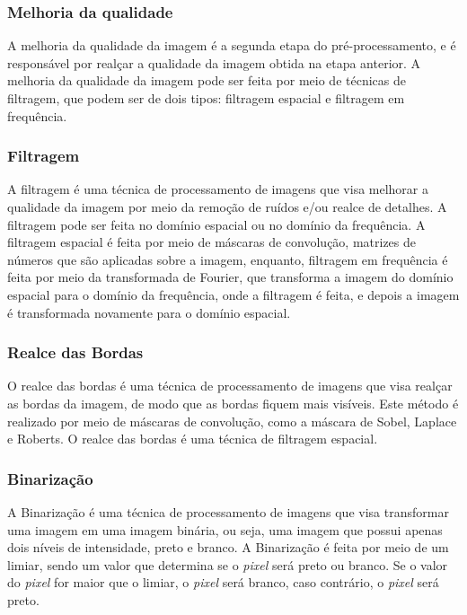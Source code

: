 \documentclass[conference]{IEEEtran}
\begin{document}
\subsubsection{Melhoria da qualidade}
A melhoria da qualidade da imagem é a segunda etapa do pré-processamento, e é responsável por realçar a qualidade 
da imagem obtida na etapa anterior. A melhoria da qualidade da imagem pode ser feita por meio de técnicas de 
filtragem, que podem ser de dois tipos: filtragem espacial e filtragem em frequência.

\subsubsection{Filtragem}

A filtragem é uma técnica de processamento de imagens que visa melhorar a qualidade da imagem por meio da 
remoção de ruídos e/ou realce de detalhes. A filtragem pode ser feita no domínio espacial ou no domínio da 
frequência. A filtragem espacial é feita por meio de máscaras de convolução, matrizes de números que são aplicadas 
sobre a imagem, enquanto, filtragem em frequência é feita por meio da transformada de Fourier, que transforma a 
imagem do domínio espacial para o domínio da frequência, onde a filtragem é feita, e depois a imagem é transformada novamente para o domínio espacial.

\subsubsection{Realce das Bordas}
O realce das bordas é uma técnica de processamento de imagens que visa realçar as bordas da imagem, 
de modo que as bordas fiquem mais visíveis. Este método é realizado por meio de máscaras de convolução, 
como a máscara de Sobel, Laplace e Roberts. O realce das bordas é uma técnica de filtragem espacial.

\subsubsection{Binarização}
A Binarização é uma técnica de processamento de imagens que visa transformar uma imagem em uma imagem binária, 
ou seja, uma imagem que possui apenas dois níveis de intensidade, preto e branco. A Binarização é feita por 
meio de um limiar, sendo um valor que determina se o \emph{pixel} será preto ou branco. Se o valor do \emph{pixel} 
for maior que o limiar, o \emph{pixel} será branco, caso contrário, o \emph{pixel} será preto.
\end{document}
